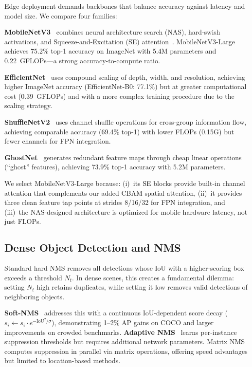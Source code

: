 \documentclass[conference]{IEEEtran}
\begin{document}
Edge deployment demands backbones that balance accuracy against latency
and model size. We compare four families:

\textbf{MobileNetV3}~\cite{howard2019mobilenetv3} combines
neural architecture search (NAS), hard-swish activations, and
Squeeze-and-Excitation (SE) attention~\cite{hu2018squeeze}. MobileNetV3-Large
achieves 75.2\% top-1 accuracy on ImageNet with 5.4M parameters and 0.22~GFLOPs---a
strong accuracy-to-compute ratio.

\textbf{EfficientNet}~\cite{tan2020efficientdet} uses compound scaling
of depth, width, and resolution, achieving higher ImageNet accuracy
(EfficientNet-B0: 77.1\%) but at greater computational cost (0.39~GFLOPs)
and with a more complex training procedure due to the scaling strategy.

\textbf{ShuffleNetV2}~\cite{zhang2018shufflenet} uses channel shuffle
operations for cross-group information flow, achieving comparable
accuracy (69.4\% top-1) with lower FLOPs (0.15G) but fewer channels
for FPN integration.

\textbf{GhostNet}~\cite{han2020ghostnet} generates redundant feature
maps through cheap linear operations (``ghost'' features), achieving
73.9\% top-1 accuracy with 5.2M parameters.

We select MobileNetV3-Large because: (i)~its SE blocks provide built-in
channel attention that complements our added CBAM spatial attention,
(ii)~it provides three clean feature tap points at strides 8/16/32 for
FPN integration, and (iii)~the NAS-designed architecture is optimized
for mobile hardware latency, not just FLOPs.

\subsection{Dense Object Detection and NMS}

Standard hard NMS removes all detections whose IoU with a higher-scoring
box exceeds a threshold $N_t$. In dense scenes, this creates a
fundamental dilemma: setting $N_t$ high retains duplicates, while
setting it low removes valid detections of neighboring objects.

\textbf{Soft-NMS}~\cite{bodla2017soft} addresses this with a continuous
IoU-dependent score decay ($s_i \leftarrow s_i \cdot e^{-\text{IoU}^2/\sigma}$),
demonstrating 1--2\% AP gains on COCO and larger improvements on
crowded benchmarks. \textbf{Adaptive NMS}~\cite{liu2019adaptive}
learns per-instance suppression thresholds but requires additional
network parameters. Matrix NMS~\cite{wang2020solo} computes suppression
in parallel via matrix operations, offering speed advantages but
limited to location-based methods.
\end{document}
